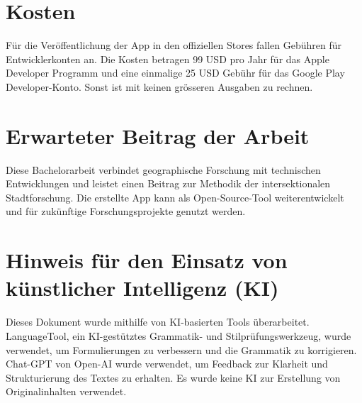 \documentclass{template}
\begin{document}
\section{Kosten}
Für die Veröffentlichung der App in den offiziellen Stores fallen Gebühren für Entwicklerkonten an. Die Kosten betragen 99 USD pro Jahr für das Apple Developer Programm und eine einmalige 25 USD Gebühr für das Google Play Developer-Konto. Sonst ist mit keinen grösseren Ausgaben zu rechnen.


\section{Erwarteter Beitrag der Arbeit}
Diese Bachelorarbeit verbindet geographische Forschung mit technischen Entwicklungen und leistet einen Beitrag zur Methodik der intersektionalen Stadtforschung. Die erstellte App kann als Open-Source-Tool weiterentwickelt und für zukünftige Forschungsprojekte genutzt werden.

\newpage
\PrintBib

\section*{Hinweis für den Einsatz von künstlicher Intelligenz (KI)}

Dieses Dokument wurde mithilfe von KI-basierten Tools überarbeitet. LanguageTool, ein KI-gestütztes Grammatik- und Stilprüfungswerkzeug, wurde verwendet, um Formulierungen zu verbessern und die Grammatik zu korrigieren. Chat-GPT von Open-AI wurde verwendet, um Feedback zur Klarheit und Strukturierung des Textes zu erhalten. Es wurde keine KI zur Erstellung von Originalinhalten verwendet.
\end{document}

